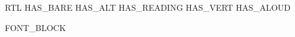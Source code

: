 %

\newcommand{\FrankLangName}{{{BABEL}}}
{{RTL}}%
{{HAS_BARE}}%
{{HAS_ALT}}%
{{HAS_READING}}%
{{HAS_VERT}}%
{{HAS_ALOUD}}%

{{FONT_BLOCK}}

